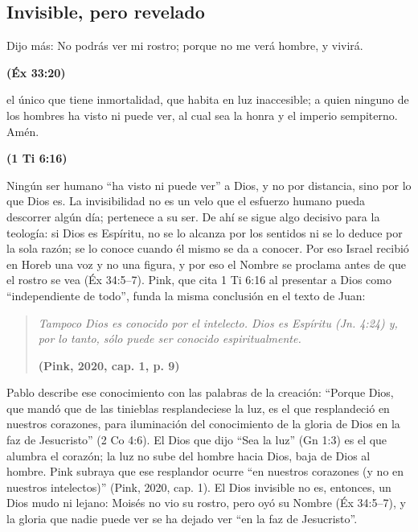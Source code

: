 \documentclass[11pt,letterpaper]{article}
\newcommand{\fuente}[1]{\par\hfill{\upshape\bfseries\small\textcolor{azul}{#1}}}
\begin{document}
\subsection{Invisible, pero revelado}

\begin{cita}Dijo más: No podrás ver mi rostro; porque no me verá hombre, y vivirá.\fuente{(Éx 33:20)}\end{cita}

\begin{cita}el único que tiene inmortalidad, que habita en luz inaccesible; a quien ninguno de los hombres ha visto ni puede ver, al cual sea la honra y el imperio sempiterno. Amén.\fuente{(1 Ti 6:16)}\end{cita}

Ningún ser humano ``ha visto ni puede ver'' a Dios, y no por distancia, sino por lo que Dios es. La invisibilidad no es un velo que el esfuerzo humano pueda descorrer algún día; pertenece a su ser. De ahí se sigue algo decisivo para la teología: si Dios es Espíritu, no se lo alcanza por los sentidos ni se lo deduce por la sola razón; se lo conoce cuando él mismo se da a conocer. Por eso Israel recibió en Horeb una voz y no una figura, y por eso el Nombre se proclama antes de que el rostro se vea (Éx 34:5--7). Pink, que cita 1 Ti 6:16 al presentar a Dios como ``independiente de todo'', funda la misma conclusión en el texto de Juan:

\begin{quote}\itshape
Tampoco Dios es conocido por el intelecto. Dios es Espíritu (Jn. 4:24) y, por lo tanto, sólo puede ser conocido espiritualmente.\par\hfill{\upshape\small\bfseries\textcolor{azul}{(Pink, 2020, cap. 1, p. 9)}}
\end{quote}

Pablo describe ese conocimiento con las palabras de la creación: ``Porque Dios, que mandó que de las tinieblas resplandeciese la luz, es el que resplandeció en nuestros corazones, para iluminación del conocimiento de la gloria de Dios en la faz de Jesucristo'' (2 Co 4:6). El Dios que dijo ``Sea la luz'' (Gn 1:3) es el que alumbra el corazón; la luz no sube del hombre hacia Dios, baja de Dios al hombre. Pink subraya que ese resplandor ocurre ``en nuestros corazones (y no en nuestros intelectos)'' (Pink, 2020, cap. 1). El Dios invisible no es, entonces, un Dios mudo ni lejano: Moisés no vio su rostro, pero oyó su Nombre (Éx 34:5--7), y la gloria que nadie puede ver se ha dejado ver ``en la faz de Jesucristo''.
\end{document}
